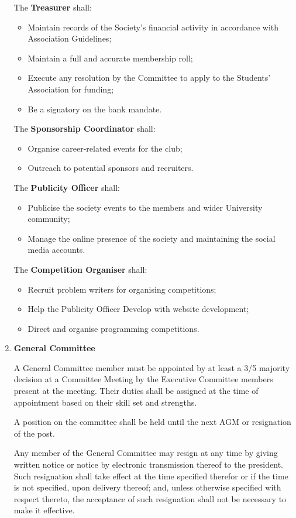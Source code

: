 \documentclass[11pt]{article}
\begin{document}
\begin{enumerate}[label = \Roman*.]
The \textbf{Treasurer} shall:
\begin{itemize}
\item Maintain records of the Society's financial activity in accordance with Association Guidelines;
\item Maintain a full and accurate membership roll;
\item Execute any resolution by the Committee to apply to the Students' Association for funding;
\item Be a signatory on the bank mandate.
\end{itemize}

The \textbf{Sponsorship Coordinator} shall:
\begin{itemize}
\item Organise career-related events for the club;
\item Outreach to potential sponsors and recruiters.
\end{itemize}

The \textbf{Publicity Officer} shall:
\begin{itemize}
\item Publicise the society events to the members and wider University community;
\item Manage the online presence of the society and maintaining the social media accounts.
\end{itemize}

The \textbf{Competition Organiser} shall:
\begin{itemize}
\item Recruit problem writers for organising competitions;
\item Help the Publicity Officer Develop with website development;
\item Direct and organise programming competitions.
\end{itemize}

\item \textbf{General Committee}

A General Committee member must be appointed by at least a 3/5 majority decision at a Committee Meeting by the Executive Committee members present at the meeting. Their duties shall be assigned at the time of appointment based on their skill set and strengths. 

A position on the committee shall be held until the next AGM or resignation of the post. 

Any member of the General Committee may resign at any time by giving written notice or notice by electronic transmission thereof to the president. Such resignation shall take effect at the time specified therefor or if the time is not specified, upon delivery thereof; and, unless otherwise specified with respect thereto, the acceptance of such resignation shall not be necessary to make it effective.


\end{enumerate}
\end{document}
